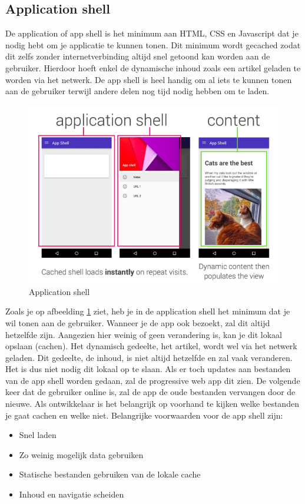 \subsection{Application shell}
De application of app shell is het minimum aan HTML, CSS en Javascript dat je nodig hebt om je applicatie te kunnen tonen. Dit minimum wordt gecached zodat dit zelfs zonder internetverbinding altijd snel getoond kan worden aan de gebruiker. Hierdoor hoeft enkel de dynamische inhoud zoals een artikel geladen te worden via het netwerk.
De app shell is heel handig om al iets te kunnen tonen aan de gebruiker terwijl andere delen nog tijd nodig hebben om te laden.
\begin{figure}[h]
	\includegraphics[scale=0.5]{img/appShell.png}
	\caption{Application shell}
	\label{fig:appShell}
\end{figure}
Zoals je op afbeelding \ref{fig:appShell} ziet, heb je in de application shell het minimum dat je wil tonen aan de gebruiker. Wanneer je de app ook bezoekt, zal dit altijd hetzelfde zijn. Aangezien hier weinig of geen verandering is, kan je dit lokaal opslaan (cachen). Het dynamisch gedeelte, het artikel, wordt wel via het netwerk geladen. Dit gedeelte, de inhoud, is niet altijd hetzelfde en zal vaak veranderen. Het is dus niet nodig dit lokaal op te slaan. Als er toch updates aan bestanden van de app shell worden gedaan, zal de progressive web app dit zien. De volgende keer dat de gebruiker online is, zal de app de oude bestanden vervangen door de nieuwe. Als ontwikkelaar is het belangrijk op voorhand te kijken welke bestanden je gaat cachen en welke niet.
Belangrijke voorwaarden voor de app shell zijn: 
\begin{itemize}  
	\item Snel laden
	\item Zo weinig mogelijk data gebruiken
	\item Statische bestanden gebruiken van de lokale cache
	\item Inhoud en navigatie scheiden
\end{itemize}

